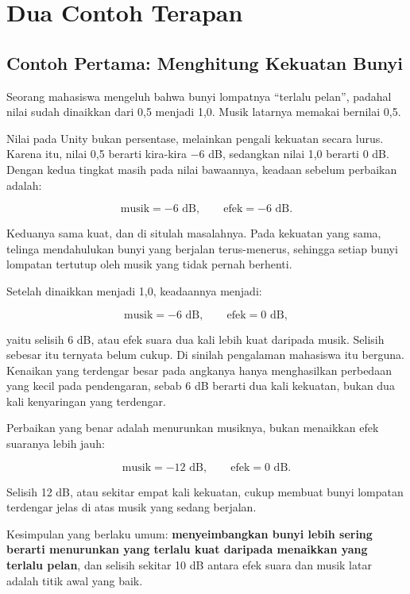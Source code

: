 \section{Dua Contoh Terapan}
\label{sec:contoh-bab-15}

\subsection{Contoh Pertama: Menghitung Kekuatan Bunyi}

\begin{contohbox}
Seorang mahasiswa mengeluh bahwa bunyi lompatnya ``terlalu pelan'', padahal
nilai  sudah dinaikkan dari 0,5 menjadi 1,0. Musik latarnya
memakai  bernilai 0,5.
\end{contohbox}

Nilai pada Unity bukan persentase, melainkan pengali kekuatan secara lurus.
Karena itu, nilai 0,5 berarti kira-kira $-6$ dB, sedangkan nilai 1,0 berarti
$0$ dB. Dengan kedua tingkat  masih pada nilai bawaannya,
keadaan sebelum perbaikan adalah:

\[
\text{musik} = -6 \text{ dB}, \qquad \text{efek} = -6 \text{ dB}.
\]

Keduanya sama kuat, dan di situlah masalahnya. Pada kekuatan yang sama, telinga
mendahulukan bunyi yang berjalan terus-menerus, sehingga setiap bunyi lompatan
tertutup oleh musik yang tidak pernah berhenti.

Setelah  dinaikkan menjadi 1,0, keadaannya menjadi:

\[
\text{musik} = -6 \text{ dB}, \qquad \text{efek} = 0 \text{ dB},
\]

yaitu selisih 6 dB, atau efek suara dua kali lebih kuat daripada musik. Selisih
sebesar itu ternyata belum cukup. Di sinilah pengalaman mahasiswa itu berguna.
Kenaikan yang terdengar besar pada angkanya hanya menghasilkan perbedaan yang
kecil pada pendengaran, sebab 6 dB berarti dua kali kekuatan, bukan dua kali
kenyaringan yang terdengar.

Perbaikan yang benar adalah menurunkan musiknya, bukan menaikkan efek suaranya
lebih jauh:

\[
\text{musik} = -12 \text{ dB}, \qquad \text{efek} = 0 \text{ dB}.
\]

Selisih 12 dB, atau sekitar empat kali kekuatan, cukup membuat bunyi lompatan
terdengar jelas di atas musik yang sedang berjalan.

Kesimpulan yang berlaku umum: \textbf{menyeimbangkan bunyi lebih sering berarti
menurunkan yang terlalu kuat daripada menaikkan yang terlalu pelan}, dan
selisih sekitar 10 dB antara efek suara dan musik latar adalah titik awal yang
baik.

